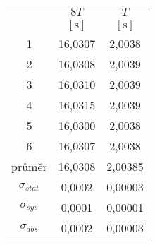 \begin{comment}
\begin{tabular}{ccccccccccc}										\toprule
						&	1		&	2		&	3		&	4		&	5		&	6		&	průměr	&	$\sigma_{stat}$		&	$\sigma_{sys}$	&	$\sigma_{abs}$	\\	\midrule
$8T [\si{\second}]$		&	16,0307	&	16,0308	&		&		&		&	16,0307	&	16,0308	&	0,0002				&	0,0001			&	0,0002			\\	
$T [\si{\second}]$		&	2,0038	&	2,0039	&	2,0039	&	2,0039	&	2,0038	&	2,0038	&	2,00385	&	0,00003				&	0,00001			&	0,00003			\\	\bottomrule
\end{tabular}\end{comment}

\begin{tabular}{ccc}												\toprule
				&	$8 T$				&	$T$				\\
				&	$[\si{\second}]$	&	$[\si{\second}]$	\\	\midrule
1				&	16,0307				&	2,0038				\\
2				&	16,0308				&	2,0039				\\
3				&	16,0310				&	2,0039				\\
4				&	16,0315				&	2,0039				\\
5				&	16,0300				&	2,0038				\\
6				&	16,0307				&	2,0038				\\	\midrule[0.5pt]
průměr			&	16,0308				&	2,00385				\\
$\sigma_{stat}$	&	0,0002				&	0,00003				\\
$\sigma_{sys}$	&	0,0001				&	0,00001				\\
$\sigma_{abs}$	&	0,0002				&	0,00003				\\	\bottomrule
\end{tabular}
